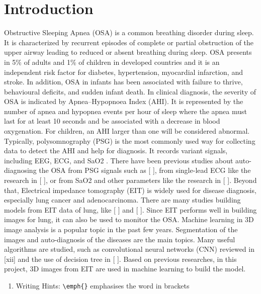 \documentclass[ a4paper, 12pt, oneside ]{article} %
\begin{document}
{\section{Introduction} %
\label{introduction} %
Obstructive Sleeping Apnea (OSA) is a common breathing disorder during sleep. It is characterized by recurrent episodes of complete or partial obstruction of the upper airway leading to reduced or absent breathing during sleep. OSA presents in 5\% of adults and 1\% of children in developed countries and it is an independent risk factor for diabetes, hypertension, myocardial infarction, and stroke. In addition, OSA in infants has been associated with failure to thrive, behavioural deficits, and sudden infant death.
In clinical diagnosis, the severity of OSA is indicated by Apnea–Hypopnoea Index (AHI). It is represented by the number of apnea and hypopnea events per hour of sleep where the apnea must last for at least 10 seconds and be associated with a decrease in blood oxygenation. For children, an AHI larger than one will be considered abnormal. Typically, polysomnography (PSG) is the most commonly used way for collecting data to detect the AHI and help for diagnosis. It records variant signals, including EEG, ECG, and SaO2 . There have been previous studies about auto-diagnosing the OSA from PSG signals such as [ ], from single-lead ECG like the research in [ ], or from SaO2 and other parameters like the research in [ ].
Beyond that, Electrical impedance tomography (EIT) is widely used for disease diagnosis, especially lung cancer and adenocarcinoma. There are many studies building models from EIT data of lung, like [ ] and [ ]. Since EIT performs well in building images for lung, it can also be used to monitor the OSA. 
Machine learning in 3D image analysis is a popular topic in the past few years. Segmentation of the images and auto-diagnosis of the diseases are the main topics. Many useful algorithms are studied, such as convolutional neural networks (CNN) reviewed in [xii] and the use of decision tree in [ ]. Based on previous researches, in this project, 3D images from EIT are used in machine learning to build the model.

\begin{enumerate}
\item{ Writing Hints:
\verb*|\emph{}| emphasises the word in brackets}


\end{enumerate}}
\end{document}
